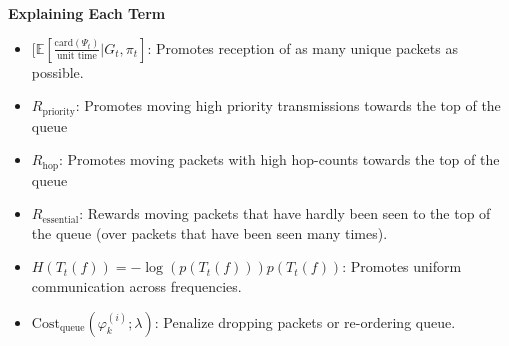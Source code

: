 \documentclass{article}
\begin{document}
\vspace{1 cm}

\textbf{Explaining Each Term}
\begin{itemize}
    \item $ [ \mathbb{E}[\frac{\text{card}(\Psi_{t})}{\text{unit time}} | G_{t}, \pi_{t}]$: Promotes reception of as many unique packets as possible.
    \item $R_{\text{priority}}$: Promotes moving high priority transmissions towards the top of the queue
    
    \item $R_{\text{hop}}$: Promotes moving packets with high hop-counts towards the top of the queue

    \item $R_{\text{essential}}$: Rewards moving packets that have hardly been seen to the top of the queue (over packets that have been seen many times).
    
    \item $H(T_{t}(f))= -\log(p(T_{t}(f))) p(T_{t}(f))$: Promotes uniform communication across frequencies.
    \item $\text{Cost}_{\text{queue}}(\varphi_{k}^{(i)}; \lambda)$: Penalize dropping packets or re-ordering queue.
\end{itemize}
\end{document}
